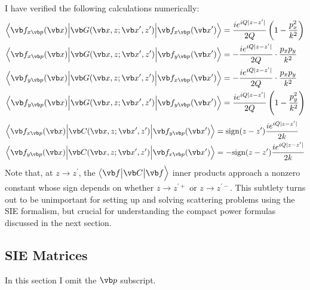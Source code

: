 \documentclass{article}
\newcommand{\vmv}[3]{ \big\langle #1 \big| #2 \big| #3 \Big\rangle}
\newcommand{\VMV}[3]{ \Big\langle #1 \Big| #2 \Big| #3 \Big\rangle}
\begin{document}
I have verified the following calculations numerically:
\begin{align*} 
 \VMV{ \vb f_{x\vb p}(\vb x) }
     { \vb G(\vb x, z; \vb x^\prime, z^\prime) }
     { \vb f_{x\vb p}(\vb x^\prime) }
 &= \frac{ ie^{iQ|z-z^\prime|} }{2Q}\left(1-\frac{p_x^2}{k^2}\right)
\\
 \VMV{ \vb f_{x\vb p}(\vb x) }
     { \vb G(\vb x, z; \vb x^\prime, z^\prime) }
     { \vb f_{y\vb p}(\vb x^\prime) }
 &= -\frac{ ie^{iQ|z-z^\prime|} }{2Q} \cdot \frac{p_x p_y}{k^2}
\\
 \VMV{ \vb f_{y\vb p}(\vb x) }
     { \vb G(\vb x, z; \vb x^\prime, z^\prime) }
     { \vb f_{x\vb p}(\vb x^\prime) }
 &= -\frac{ ie^{iQ|z-z^\prime|} }{2Q} \cdot \frac{p_x p_y}{k^2}
\\
 \VMV{ \vb f_{y\vb p}(\vb x) }
     { \vb G(\vb x, z; \vb x^\prime, z^\prime) }
     { \vb f_{y\vb p}(\vb x^\prime) }
 &= \frac{ ie^{iQ|z-z^\prime|} }{2Q}\left(1-\frac{p_y^2}{k^2}\right)
\end{align*} 
\begin{align*} 
 \VMV{ \vb f_{x\vb p}(\vb x) }
     { \vb C(\vb x, z; \vb x^\prime, z^\prime) }
     { \vb f_{y\vb p}(\vb x^\prime) }
 &=  \text{sign}(z-z^\prime) \frac{ i e^{iQ|z-z^\prime|} }{2k}
\\
 \VMV{ \vb f_{y\vb p}(\vb x) }
     { \vb C(\vb x, z; \vb x^\prime, z^\prime) }
     { \vb f_{x\vb p}(\vb x^\prime) }
 &= -\text{sign}(z-z^\prime) \frac{ i e^{iQ|z-z^\prime|} }{2k}
\end{align*} 
%
Note that, at $z\to z^\prime$, the $\vmv{\vb f}{\vb C}{\vb f}$
inner products approach a nonzero constant whose sign depends 
on whether $z\to z^{\prime +}$ or $z\to z^{\prime -}$. This 
subtlety turns out to be unimportant for setting up and 
solving scattering problems using the SIE formalism, but 
crucial for understanding the compact power formulas discussed
in the next section.

\newpage
\subsection{SIE Matrices}

In this section I omit the $\vb p$ subscript.
\end{document}
